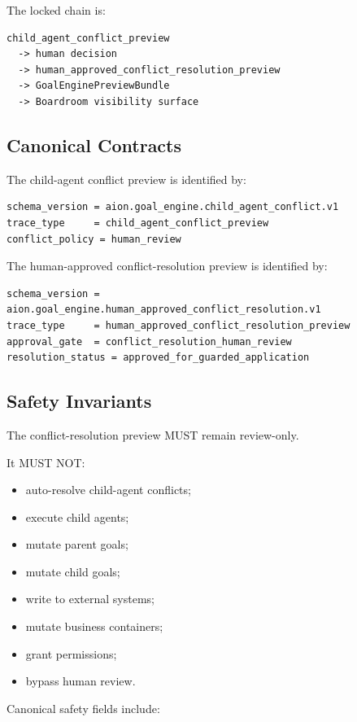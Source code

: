 The locked chain is:

\begin{verbatim}
child_agent_conflict_preview
  -> human decision
  -> human_approved_conflict_resolution_preview
  -> GoalEnginePreviewBundle
  -> Boardroom visibility surface
\end{verbatim}

\subsection{Canonical Contracts}

The child-agent conflict preview is identified by:

\begin{verbatim}
schema_version = aion.goal_engine.child_agent_conflict.v1
trace_type     = child_agent_conflict_preview
conflict_policy = human_review
\end{verbatim}

The human-approved conflict-resolution preview is identified by:

\begin{verbatim}
schema_version = aion.goal_engine.human_approved_conflict_resolution.v1
trace_type     = human_approved_conflict_resolution_preview
approval_gate  = conflict_resolution_human_review
resolution_status = approved_for_guarded_application
\end{verbatim}

\subsection{Safety Invariants}

The conflict-resolution preview MUST remain review-only.

It MUST NOT:

\begin{itemize}
  \item auto-resolve child-agent conflicts;
  \item execute child agents;
  \item mutate parent goals;
  \item mutate child goals;
  \item write to external systems;
  \item mutate business containers;
  \item grant permissions;
  \item bypass human review.
\end{itemize}

Canonical safety fields include:

